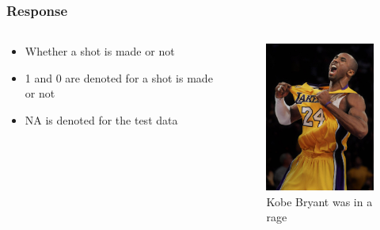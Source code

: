 \documentclass{beamer}
\begin{document}
\frame
{
  	\frametitle{Response}
	\begin{columns}
		\begin{column}{0.5\textwidth}
			\begin{itemize}
				\item {Whether a shot is made or not}
				\item{1 and 0 are denoted for a shot is made or not}
				\item{NA is denoted for the test data}
			\end{itemize}

		\end{column}
  		\begin{column}{0.5\textwidth}
			\begin{figure}
    				\begin{center}
        					\includegraphics[width=110pt]{figure/Kobe_2.png}
        					\caption{Kobe Bryant was in a rage}
       					\label{}
    				\end{center}
			\end{figure}
		\end{column}
	\end{columns}
}
\end{document}
